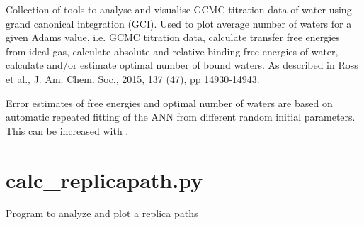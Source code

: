 \documentclass[letterpaper,10pt,english]{sphinxmanual}
\begin{document}

%
\begin{sphinxVerbatim}[commandchars=\\\{\}]
    
      
     
     
\end{sphinxVerbatim}


Collection of tools to analyse and visualise GCMC titration data of water using grand canonical integration (GCI). Used to plot average number of waters for a given Adams value, i.e. GCMC titration data, calculate transfer free energies from ideal gas, calculate absolute and relative binding free energies of water, calculate and/or estimate optimal number of bound waters. As described in Ross et al., J. Am. Chem. Soc., 2015, 137 (47), pp 14930-14943.

Error estimates of free energies and optimal number of waters are based on automatic repeated fitting of the ANN from different random initial parameters. This can be increased with .


\section{calc\_replicapath.py}
\label{\detokenize{tools:calc-replicapath-py}}

Program to analyze and plot a replica paths


%
\begin{sphinxVerbatim}[commandchars=\\\{\}]
  \PYG{p}{[}\PYG{p}{]} \PYG{p}{[}  \PYG{p}{[} \PYG{p}{]}\PYG{p}{]} \PYG{p}{[}  \PYG{p}{[} \PYG{p}{]}\PYG{p}{]}
                           \PYG{p}{[} \PYG{p}{]} \PYG{p}{[} \PYG{p}{]}
\end{sphinxVerbatim}
\end{document}
